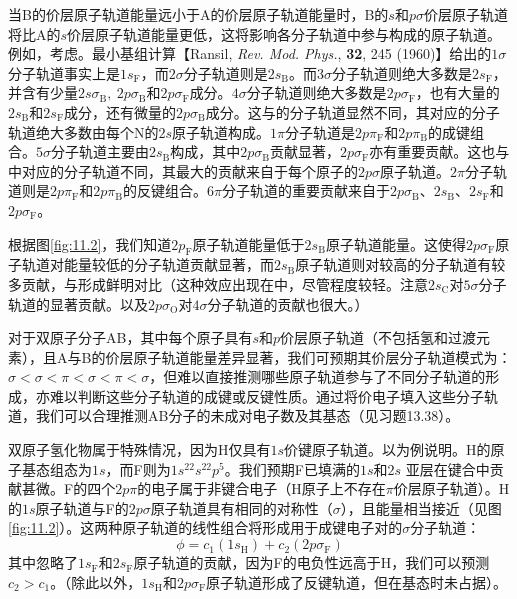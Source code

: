     当B的价层原子轨道能量远小于A的价层原子轨道能量时，B的$s$和$p\sigma$价层原子轨道将比A的$s$价层原子轨道能量更低，这将影响各分子轨道中参与构成的原子轨道。例如，考虑。最小基组计算【Ransil, \textit{Rev. Mod. Phys.}, \textbf{32}, 245 (1960)】给出的$1\sigma$分子轨道事实上是$1s_{\mathrm{F}}$，而$2\sigma$分子轨道则是$2s_{\mathrm{B}}$。而$3\sigma$分子轨道则绝大多数是$2s_{\mathrm{F}}$，并含有少量$2s\sigma_{\mathrm{B}},\:2p\sigma_{\mathrm{B}}$和$2p\sigma_{\mathrm{F}}$成分。$4\sigma$分子轨道则绝大多数是$2p\sigma_{\mathrm{F}}$，也有大量的$2s_{\mathrm{B}}$和$2s_{\mathrm{F}}$成分，还有微量的$2p\sigma_{\mathrm{B}}$成分。这与的分子轨道显然不同，其对应的分子轨道绝大多数由每个N的$2s$原子轨道构成。$1\pi$分子轨道是$2p\pi_{\mathrm{F}}$和$2p\pi_{\mathrm{B}}$的成键组合。$5\sigma$分子轨道主要由$2s_{\mathrm{B}}$构成，其中$2p\sigma_{\mathrm{B}}$贡献显著，$2p\sigma_{\mathrm{F}}$亦有重要贡献。这也与中对应的分子轨道不同，其最大的贡献来自于每个原子的$2p\sigma$原子轨道。$2\pi$分子轨道则是$2p\pi_{\mathrm{F}}$和$2p\pi_{\mathrm{B}}$的反键组合。$6\pi$分子轨道的重要贡献来自于$2p\sigma_{\mathrm{B}}$、$2s_{\mathrm{B}}$、$2s_{\mathrm{F}}$和$2p\sigma_{\mathrm{F}}$。

    根据图\ref{fig:11.2}，我们知道$2p_{\mathrm{F}}$原子轨道能量低于$2s_{\mathrm{B}}$原子轨道能量。这使得$2p\sigma_{\mathrm{F}}$原子轨道对能量较低的分子轨道贡献显著，而$2s_{\mathrm{B}}$原子轨道则对较高的分子轨道有较多贡献，与形成鲜明对比（这种效应出现在中，尽管程度较轻。注意$2s_{\mathrm{C}}$对$5\sigma$分子轨道的显著贡献。以及$2p\sigma_{\mathrm{O}}$对$4\sigma$分子轨道的贡献也很大。）

    对于双原子分子AB，其中每个原子具有$s$和$p$价层原子轨道（不包括氢和过渡元素），且A与B的价层原子轨道能量差异显著，我们可预期其价层分子轨道模式为：$\sigma < \sigma < \pi < \sigma < \pi < \sigma$，但难以直接推测哪些原子轨道参与了不同分子轨道的形成，亦难以判断这些分子轨道的成键或反键性质。通过将价电子填入这些分子轨道，我们可以合理推测AB分子的未成对电子数及其基态（见习题13.38）。

    双原子氢化物属于特殊情况，因为H仅具有$1s$价键原子轨道。以为例说明。H的原子基态组态为$1s$，而F则为$1s^22s^22p^5$。我们预期F已填满的$1s$和$2s$ 亚层在键合中贡献甚微。F的四个$2p\pi$的电子属于非键合电子（H原子上不存在$\pi$价层原子轨道）。H的$1s$原子轨道与F的$2p\sigma$原子轨道具有相同的对称性（$\sigma$），且能量相当接近（见图\ref{fig:11.2}）。这两种原子轨道的线性组合将形成用于成键电子对的$\sigma$分子轨道：
    \begin{equation*}
        \phi = c_1(1s_{\mathrm{H}}) + c_2(2p\sigma_{\mathrm{F}})
    \end{equation*}
    其中忽略了$1s_{\mathrm{F}}$和$2s_{\mathrm{F}}$原子轨道的贡献，因为F的电负性远高于H，我们可以预测$c_2 > c_1$。（除此以外，$1s_{\mathrm{H}}$和$2p\sigma_{\mathrm{F}}$原子轨道形成了反键轨道，但在基态时未占据）。

